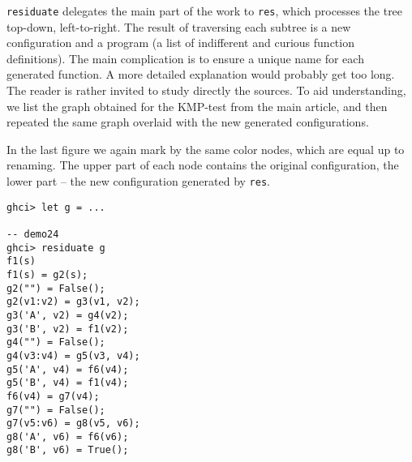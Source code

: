 \texttt{residuate} delegates the main part of the work to \texttt{res}, which processes 
the tree top-down, left-to-right.
The result of traversing each subtree is a new configuration and a program
(a list of indifferent and curious function definitions).
The main complication is to ensure a unique name for each
generated function.
A more detailed explanation would probably get too long.
The reader is rather invited to study directly the sources.
To aid understanding, we list the graph obtained for the KMP-test
from the main article, and then repeated the same graph
overlaid with the new generated configurations.






In the last figure we again mark by the same color nodes, which are equal
up to renaming.
The upper part of each node contains the original configuration,
the lower part -- the new configuration generated by \texttt{res}.

\begin{lstlisting}[style=demo,escapechar=!]
ghci> let g = ...

-- demo24
ghci> residuate g
f1(s)
f1(s) = g2(s);
g2("") = False();
g2(v1:v2) = g3(v1, v2);
g3('A', v2) = g4(v2);
g3('B', v2) = f1(v2);
g4("") = False();
g4(v3:v4) = g5(v3, v4);
g5('A', v4) = f6(v4);
g5('B', v4) = f1(v4);
f6(v4) = g7(v4);
g7("") = False();
g7(v5:v6) = g8(v5, v6);
g8('A', v6) = f6(v6);
g8('B', v6) = True();
\end{lstlisting}